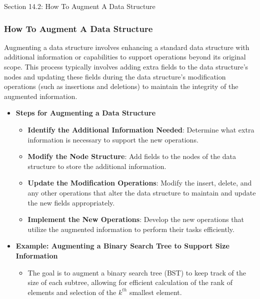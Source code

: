 \begin{notes}{Section 14.2: How To Augment A Data Structure}
    \subsubsection*{How To Augment A Data Structure}

    Augmenting a data structure involves enhancing a standard data structure with additional information or capabilities to support operations beyond its original scope. This process typically involves 
    adding extra fields to the data structure's nodes and updating these fields during the data structure's modification operations (such as insertions and deletions) to maintain the integrity of the 
    augmented information.
    
    \begin{itemize}
        \item \textbf{Steps for Augmenting a Data Structure}
        \begin{itemize}
            \item \textbf{Identify the Additional Information Needed}: Determine what extra information is necessary to support the new operations.
            \item \textbf{Modify the Node Structure}: Add fields to the nodes of the data structure to store the additional information.
            \item \textbf{Update the Modification Operations}: Modify the insert, delete, and any other operations that alter the data structure to maintain and update the new fields appropriately.
            \item \textbf{Implement the New Operations}: Develop the new operations that utilize the augmented information to perform their tasks efficiently.
        \end{itemize}
        
        \item \textbf{Example: Augmenting a Binary Search Tree to Support Size Information}
        \begin{itemize}
            \item The goal is to augment a binary search tree (BST) to keep track of the size of each subtree, allowing for efficient calculation of the rank of elements and selection of the $k^{th}$ 
            smallest element.
        \end{itemize}
    \end{itemize}
    

\end{notes}

